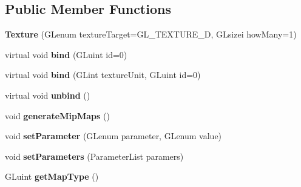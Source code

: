 \subsection*{Public Member Functions}
\begin{DoxyCompactItemize}
\item 
\hypertarget{classfillwave_1_1core_1_1Texture_a457b19cf808982fa1294a475f0e831a2}{}{\bfseries Texture} (G\+Lenum texture\+Target=G\+L\+\_\+\+T\+E\+X\+T\+U\+R\+E\+\_\+D, G\+Lsizei how\+Many=1)\label{classfillwave_1_1core_1_1Texture_a457b19cf808982fa1294a475f0e831a2}

\item 
\hypertarget{classfillwave_1_1core_1_1Texture_ae4f4239ee206286bdc6ccf34becc7693}{}virtual void {\bfseries bind} (G\+Luint id=0)\label{classfillwave_1_1core_1_1Texture_ae4f4239ee206286bdc6ccf34becc7693}

\item 
\hypertarget{classfillwave_1_1core_1_1Texture_a5b7741fad01bfbae9b24fb17299cd7a8}{}virtual void {\bfseries bind} (G\+Lint texture\+Unit, G\+Luint id=0)\label{classfillwave_1_1core_1_1Texture_a5b7741fad01bfbae9b24fb17299cd7a8}

\item 
\hypertarget{classfillwave_1_1core_1_1Texture_a13743cc60f6c697d0a753ddf467626cf}{}virtual void {\bfseries unbind} ()\label{classfillwave_1_1core_1_1Texture_a13743cc60f6c697d0a753ddf467626cf}

\item 
\hypertarget{classfillwave_1_1core_1_1Texture_a0d5ce50e1f3b4ae74539919bc3aa294f}{}void {\bfseries generate\+Mip\+Maps} ()\label{classfillwave_1_1core_1_1Texture_a0d5ce50e1f3b4ae74539919bc3aa294f}

\item 
\hypertarget{classfillwave_1_1core_1_1Texture_a4a41fa5a9a5f7c907c9e473b8d44924d}{}void {\bfseries set\+Parameter} (G\+Lenum parameter, G\+Lenum value)\label{classfillwave_1_1core_1_1Texture_a4a41fa5a9a5f7c907c9e473b8d44924d}

\item 
\hypertarget{classfillwave_1_1core_1_1Texture_a19740fe76c81ceff1274a966a5bf3e44}{}void {\bfseries set\+Parameters} (Parameter\+List paramers)\label{classfillwave_1_1core_1_1Texture_a19740fe76c81ceff1274a966a5bf3e44}

\item 
\hypertarget{classfillwave_1_1core_1_1Texture_a991b5b12089aa45ecc13a9db91ee59da}{}G\+Luint {\bfseries get\+Map\+Type} ()\label{classfillwave_1_1core_1_1Texture_a991b5b12089aa45ecc13a9db91ee59da}


\end{DoxyCompactItemize}
